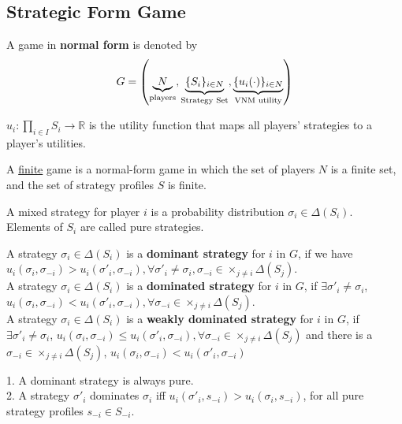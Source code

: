 \documentclass[11pt]{elegantbook}
\begin{document}
\subsection{Strategic Form Game}
\begin{definition}
    \normalfont
    A game in \textbf{normal form} is denoted by $$G =\left(\underbrace{N}_{\textnormal{players}},\underbrace{\{S_i\}_{i\in N}}_{\textnormal{Strategy Set}},\underbrace{\{u_i(\cdot)\}_{i\in N}}_{\textnormal{VNM utility}}\right)$$

    $u_i:\prod_{i\in I}S_i \rightarrow \mathbb{R}$ is the utility function that maps all players' strategies to a player's utilities.

    A \underline{finite} game is a normal-form game in which the set of players $N$ is a finite set, and the set of strategy profiles $S$ is finite.
\end{definition}

\begin{definition}
\normalfont
A mixed strategy  for player $i$ is a probability distribution $\sigma_i\in\Delta(S_i)$.\\
Elements of $S_i$ are called pure strategies.
\end{definition}

\begin{definition}
    \normalfont
    A strategy $\sigma_i\in \Delta(S_i)$ is a \textbf{dominant strategy} for $i$ in $G$, if we have $u_i(\sigma_i,\sigma_{-i})> u_i(\sigma'_i,\sigma_{-i}), \forall \sigma'_i\neq \sigma_i, \sigma_{-i}\in\times_{j\neq i}\Delta(S_j)$.\\
    A strategy $\sigma_i\in \Delta(S_i)$ is a \textbf{dominated strategy} for $i$ in $G$, if $\exists \sigma'_i\neq \sigma_i$, $u_i(\sigma_i,\sigma_{-i})<u_i(\sigma'_i,\sigma_{-i}), \forall \sigma_{-i}\in\times_{j\neq i}\Delta(S_j)$.\\
    A strategy $\sigma_i\in \Delta(S_i)$ is a \textbf{weakly dominated strategy} for $i$ in $G$, if $\exists \sigma'_i\neq \sigma_i$, $u_i(\sigma_i,\sigma_{-i})\leq u_i(\sigma'_i,\sigma_{-i}), \forall \sigma_{-i}\in\times_{j\neq i}\Delta(S_j)$ and there is a $\sigma_{-i}\in\times_{j\neq i}\Delta(S_j)$, $u_i(\sigma_i,\sigma_{-i})< u_i(\sigma'_i,\sigma_{-i})$
\end{definition}

\begin{lemma}
    1. A dominant strategy is always pure.\\
    2. A strategy $\sigma'_i$ dominates $\sigma_i$ iff $u_i(\sigma'_i,s_{-i})> u_i(\sigma_i,s_{-i})$, for all pure strategy profiles $s_{-i}\in S_{-i}$.
\end{lemma}
\end{document}
